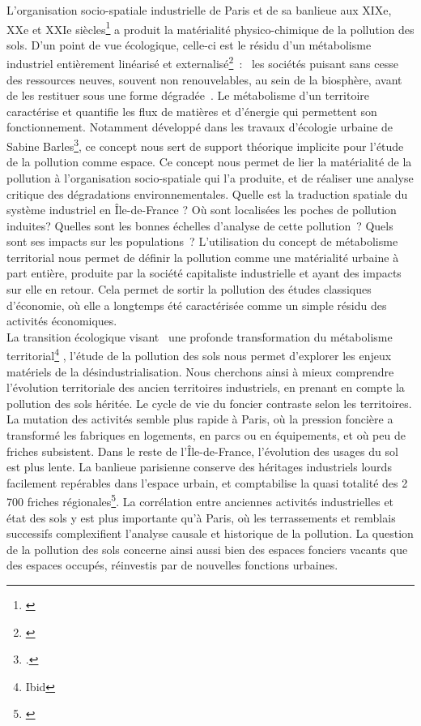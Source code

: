 \documentclass[a4paper,twoside,12pt]{book}
\begin{document}
L’organisation socio-spatiale industrielle de Paris et de sa banlieue aux XIXe, XXe et XXIe siècles\footnote{\cite{guillerme_dangereux_2004}} a produit la matérialité physico-chimique de la pollution des sols. D’un point de vue écologique, celle-ci est le résidu d’un métabolisme industriel entièrement linéarisé et externalisé\footnote{\cite{barles_ecologie_2017}} : \og{} les sociétés puisant sans cesse des ressources neuves, souvent non renouvelables, au sein de la biosphère, avant de les restituer sous une forme dégradée \fg{}. Le métabolisme d'un territoire caractérise et quantifie les flux de matières et d'énergie qui permettent son fonctionnement. Notamment développé dans les travaux d'écologie urbaine de Sabine Barles\footcite{barles_sol_1999}, ce concept nous sert de support théorique implicite pour l'étude de la pollution comme espace. Ce concept nous permet de lier la matérialité de la pollution à l'organisation socio-spatiale qui l'a produite, et de réaliser une analyse critique des dégradations environnementales. Quelle est la traduction spatiale du système industriel en Île-de-France ? Où sont localisées les poches de pollution induites? Quelles sont les bonnes échelles d’analyse de cette pollution ? Quels sont ses impacts sur les populations ? L’utilisation du concept de métabolisme territorial nous permet de définir la pollution comme une matérialité urbaine à part entière, produite par la société capitaliste industrielle et ayant des impacts sur elle en retour. Cela permet de sortir la pollution des études classiques d’économie, où elle a longtemps été caractérisée comme un simple résidu des activités économiques. \\

La transition écologique visant \og{} une profonde transformation du métabolisme territorial\footnote{Ibid} \fg{}, l’étude de la pollution des sols nous permet d’explorer les enjeux matériels de la désindustrialisation. Nous cherchons ainsi à mieux comprendre l'évolution territoriale des ancien territoires industriels, en prenant en compte la pollution des sols héritée. Le cycle de vie du foncier contraste selon les territoires. La mutation des activités semble plus rapide à Paris, où la pression foncière a transformé les fabriques en logements, en parcs ou en équipements, et où peu de friches subsistent. Dans le reste de l’Île-de-France, l’évolution des usages du sol est plus lente. La banlieue parisienne conserve des héritages industriels lourds facilement repérables dans l’espace urbain, et comptabilise la quasi totalité des 2 700 friches régionales\footnote{\cite{institut_paris_regions_observatoire_2021}}. La corrélation entre anciennes activités industrielles et état des sols y est plus importante qu’à Paris, où les terrassements et remblais successifs complexifient l’analyse causale et historique de la pollution. La question de la pollution des sols concerne ainsi aussi bien des espaces fonciers vacants que des espaces occupés, réinvestis par de nouvelles fonctions urbaines. \\
\end{document}

